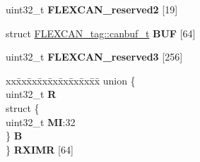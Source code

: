 \begin{DoxyCompactItemize}
\begin{tabbing}
\end{tabbing}\item 
\mbox{\label{structFLEXCAN__tag_a5f1cd06b20fb4e1845910cba993d10a6}} 
uint32\+\_\+t {\bfseries F\+L\+E\+X\+C\+A\+N\+\_\+reserved2} \mbox{[}19\mbox{]}
\item 
\mbox{\label{structFLEXCAN__tag_ae7be6484ff2a3df76ed909a0baead8c0}} 
struct \mbox{\hyperlink{structFLEXCAN__tag_1_1canbuf__t}{F\+L\+E\+X\+C\+A\+N\+\_\+tag\+::canbuf\+\_\+t}} {\bfseries B\+UF} \mbox{[}64\mbox{]}
\item 
\mbox{\label{structFLEXCAN__tag_ae81ae13e1734ecfdc46060da537b6d50}} 
uint32\+\_\+t {\bfseries F\+L\+E\+X\+C\+A\+N\+\_\+reserved3} \mbox{[}256\mbox{]}
\item 
\mbox{\label{structFLEXCAN__tag_a25b6d27780d5488964e7a6d3d2de3119}} 
\begin{tabbing}
xx\=xx\=xx\=xx\=xx\=xx\=xx\=xx\=xx\=\kill
union \{\\
\>uint32\_t {\bfseries R}\\
\>struct \{\\
\>\>uint32\_t {\bfseries MI}:32\\
\>\} {\bfseries B}\\
\} {\bfseries RXIMR} \mbox{[}64\mbox{]}\\


\end{tabbing}
\end{DoxyCompactItemize}
